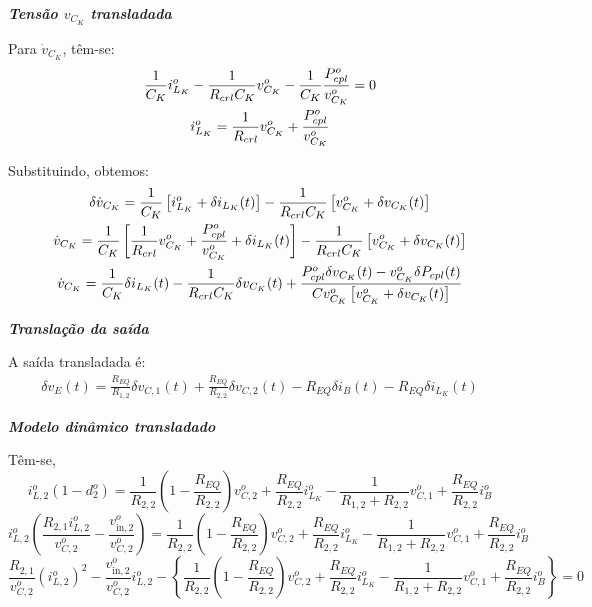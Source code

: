 \documentclass{article}
\newcommand{\nle}{%
  \notag \\[0pt]
}
\begin{document}
\textbf{\textit{Tensão $v_{C_K}$ transladada}} \vspace*{12pt}

Para $\dot{v}_{C_K}$, têm-se:
\begin{gather*}
  \frac{1}{C_K} i_{L_K}^o - \frac{1}{R_{crl} C_K} v_{C_K}^o - \frac{1}{C_K} \frac{P_{cpl}^o}{v_{C_K}^o} = 0 \nle
  i_{L_K}^o = \frac{1}{R_{crl}} v_{C_K}^o + \frac{P_{cpl}^o}{v_{C_K}^o}
\end{gather*}

Substituindo, obtemos:
\begin{gather*}
  \delta \dot{v}_{C_K} = \frac{1}{C_K} \left[i_{L_K}^o + \delta i_{L_K}(t)\right]
  - \frac{1}{R_{crl} C_K} \left[v_{C_K}^o + \delta v_{C_K}(t)\right] \nle
  \dot{v}_{C_K} = \frac{1}{C_K} \left[\frac{1}{R_{crl}} v_{C_K}^o + \frac{P_{cpl}^o}{v_{C_K}^o} + \delta i_{L_K}(t)\right]
  - \frac{1}{R_{crl} C_K} \left[v_{C_K}^o + \delta v_{C_K}(t)\right] \nle
  \dot{v}_{C_K} = \frac{1}{C_K} \delta i_{L_K}(t)
  - \frac{1}{R_{crl} C_K} \delta v_{C_K}(t)
  + \frac{P_{cpl}^o \delta v_{C_K}(t) - v_{C_K}^o \delta P_{cpl}(t)}{Cv_{C_K}^o\left[v_{C_K}^o + \delta v_{C_K}(t)\right]}
\end{gather*}

\textbf{\textit{Translação da saída}} \vspace*{12pt}

A saída transladada é:
\begin{gather}
  \delta v_E(t) = \frac{R_{EQ}}{R_{1,2}} \delta v_{C,1}(t) + \frac{R_{EQ}}{R_{2,2}} \delta v_{C,2}(t) - R_{EQ} \delta i_B(t) - R_{EQ} \delta i_{L_K}(t)
\end{gather}


\textbf{\textit{Modelo dinâmico transladado}} \vspace*{12pt}

Têm-se,
\begin{equation*}
  i_{L,2}^o \left(1 - d_2^o\right) = \frac{1}{R_{2,2}} \left(1 - \frac{R_{EQ}}{R_{2,2}}\right) v_{C,2}^o + \frac{R_{EQ}}{R_{2,2}} i_{L_K}^o - \frac{1} {R_{1,2} + R_{2,2}} v_{C,1}^o + \frac{R_{EQ}}{R_{2,2}} i_B^o
\end{equation*}
\begin{equation*}
  i_{L,2}^o \left(\frac{R_{2,1}i_{L,2}^o}{v_{C,2}^o} - \frac{v_{\text{in},2}^o}{v_{C,2}^o}\right) = \frac{1}{R_{2,2}} \left(1 - \frac{R_{EQ}}{R_{2,2}}\right) v_{C,2}^o + \frac{R_{EQ}}{R_{2,2}} i_{L_K}^o - \frac{1} {R_{1,2} + R_{2,2}} v_{C,1}^o + \frac{R_{EQ}}{R_{2,2}} i_B^o
\end{equation*}
\begin{equation*}
  \frac{R_{2,1}}{v_{C,2}^o}({i_{L,2}^o})^2 - \frac{v_{\text{in},2}^o}{v_{C,2}^o}{i_{L,2}^o}
  - \left\{\frac{1}{R_{2,2}} \left(1 - \frac{R_{EQ}}{R_{2,2}}\right) v_{C,2}^o + \frac{R_{EQ}}{R_{2,2}} i_{L_K}^o - \frac{1} {R_{1,2} + R_{2,2}} v_{C,1}^o + \frac{R_{EQ}}{R_{2,2}} i_B^o \right\} = 0
\end{equation*}
\end{document}
